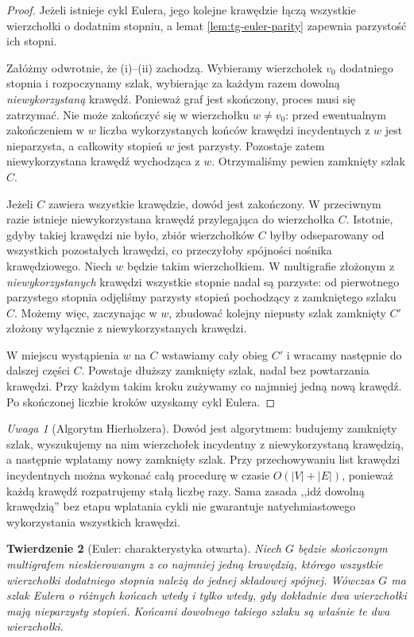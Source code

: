 \documentclass[11pt,a4paper]{report}
\numberwithin{equation}{section}
\theoremstyle{plain}
\newtheorem{twierdzenie}{Twierdzenie}[section]
\theoremstyle{definition}
\theoremstyle{remark}
\newtheorem{uwaga}[twierdzenie]{Uwaga}
\begin{document}
\begin{proof}
Jeżeli istnieje cykl Eulera, jego kolejne krawędzie łączą
wszystkie wierzchołki o dodatnim stopniu, a lemat
\ref{lem:tg-euler-parity} zapewnia parzystość ich stopni.

Załóżmy odwrotnie, że (i)--(ii) zachodzą. Wybieramy wierzchołek
$v_0$ dodatniego stopnia i rozpoczynamy szlak, wybierając
za każdym razem dowolną \emph{niewykorzystaną} krawędź.
Ponieważ graf jest skończony, proces musi się zatrzymać.
Nie może zakończyć się w wierzchołku $w\ne v_0$:
przed ewentualnym zakończeniem w $w$ liczba wykorzystanych
końców krawędzi incydentnych z $w$ jest nieparzysta,
a całkowity stopień $w$ jest parzysty. Pozostaje zatem
niewykorzystana krawędź wychodząca z $w$.
Otrzymaliśmy pewien zamknięty szlak $C$.

Jeżeli $C$ zawiera wszystkie krawędzie, dowód jest zakończony.
W przeciwnym razie istnieje niewykorzystana krawędź
przylegająca do wierzchołka $C$. Istotnie, gdyby takiej
krawędzi nie było, zbiór wierzchołków $C$ byłby odseparowany
od wszystkich pozostałych krawędzi, co przeczyłoby spójności
nośnika krawędziowego. Niech $w$ będzie takim wierzchołkiem.
W multigrafie złożonym z \emph{niewykorzystanych} krawędzi
wszystkie stopnie nadal są parzyste: od pierwotnego
parzystego stopnia odjęliśmy parzysty stopień pochodzący
z zamkniętego szlaku $C$. Możemy więc, zaczynając w $w$,
zbudować kolejny niepusty szlak zamknięty $C'$ złożony
wyłącznie z niewykorzystanych krawędzi.

W miejscu wystąpienia $w$ na $C$ wstawiamy cały obieg $C'$
i wracamy następnie do dalszej części $C$. Powstaje dłuższy
zamknięty szlak, nadal bez powtarzania krawędzi.
Przy każdym takim kroku zużywamy co najmniej jedną nową
krawędź. Po skończonej liczbie kroków uzyskamy cykl Eulera.
\end{proof}

\begin{uwaga}[Algorytm Hierholzera]
Dowód jest algorytmem: budujemy zamknięty szlak, wyszukujemy
na nim wierzchołek incydentny z niewykorzystaną krawędzią,
a następnie wplatamy nowy zamknięty szlak. Przy przechowywaniu
list krawędzi incydentnych można wykonać całą procedurę w czasie
$O(|V|+|E|)$, ponieważ każdą krawędź rozpatrujemy
stałą liczbę razy. Sama zasada ,,idź dowolną krawędzią''
bez etapu wplatania cykli nie gwarantuje natychmiastowego
wykorzystania wszystkich krawędzi.
\end{uwaga}

\begin{twierdzenie}[Euler: charakterystyka otwarta]
\label{thm:tg-euler-trail}
Niech $G$ będzie skończonym multigrafem nieskierowanym
z co najmniej jedną krawędzią, którego wszystkie wierzchołki
dodatniego stopnia należą do jednej składowej spójnej.
Wówczas $G$ ma szlak Eulera o różnych końcach wtedy
i tylko wtedy, gdy dokładnie dwa wierzchołki mają
nieparzysty stopień. Końcami dowolnego takiego szlaku
są właśnie te dwa wierzchołki.
\end{twierdzenie}
\end{document}
